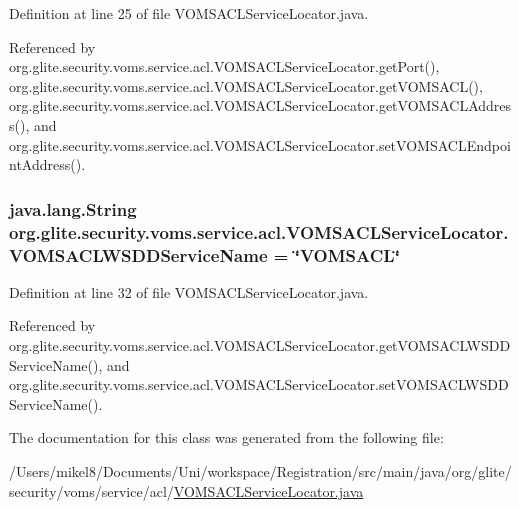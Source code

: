 Definition at line 25 of file VOMSACLServiceLocator.java.



Referenced by org.glite.security.voms.service.acl.VOMSACLServiceLocator.getPort(), org.glite.security.voms.service.acl.VOMSACLServiceLocator.getVOMSACL(), org.glite.security.voms.service.acl.VOMSACLServiceLocator.getVOMSACLAddress(), and org.glite.security.voms.service.acl.VOMSACLServiceLocator.setVOMSACLEndpointAddress().

\hypertarget{classorg_1_1glite_1_1security_1_1voms_1_1service_1_1acl_1_1VOMSACLServiceLocator_a6ebe08020aea57b83fa59d577a8a32fd}{
\subsubsection[{VOMSACLWSDDServiceName}]{\setlength{\rightskip}{0pt plus 5cm}java.lang.String {\bf org.glite.security.voms.service.acl.VOMSACLServiceLocator.VOMSACLWSDDServiceName} = \char`\"{}VOMSACL\char`\"{}}}
\label{classorg_1_1glite_1_1security_1_1voms_1_1service_1_1acl_1_1VOMSACLServiceLocator_a6ebe08020aea57b83fa59d577a8a32fd}


Definition at line 32 of file VOMSACLServiceLocator.java.



Referenced by org.glite.security.voms.service.acl.VOMSACLServiceLocator.getVOMSACLWSDDServiceName(), and org.glite.security.voms.service.acl.VOMSACLServiceLocator.setVOMSACLWSDDServiceName().



The documentation for this class was generated from the following file:\begin{DoxyCompactItemize}
\item 
/Users/mikel8/Documents/Uni/workspace/Registration/src/main/java/org/glite/security/voms/service/acl/\hyperlink{VOMSACLServiceLocator_8java}{VOMSACLServiceLocator.java}\end{DoxyCompactItemize}
